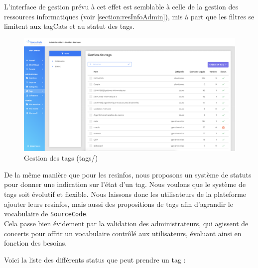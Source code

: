 L'interface de gestion prévu à cet effet est semblable à celle de la gestion des ressources informatiques (voir \ref{section:resInfoAdmin}), mis à part que les filtres se limitent aux \glspl{tagCat} et au statut des \glspl{tag}.

\begin{figure}[H]
    \includegraphics[width=\textwidth,height=\textheight,keepaspectratio]{images/client/tag-admin.png}
    \centering
    \caption[SourceCode : gestion des \glspl{tag}]{Gestion des \glspl{tag} (tags/)}
\end{figure}


De la même manière que pour les \glspl{resinfo}, nous proposons un système de statuts pour donner une indication sur l'état d'un \gls{tag}. Nous voulons que le système de \glspl{tag} soit évolutif et flexible. Nous laissons donc les utilisateurs de la plateforme ajouter leurs \glspl{resinfo}, mais aussi des propositions de \glspl{tag} afin d'agrandir le vocabulaire de \texttt{SourceCode}.\\

Cela passe bien évidement par la validation des administrateurs, qui agissent de concerts pour offrir un vocabulaire contrôlé aux utilisateurs, évoluant ainsi en fonction des besoins.

Voici la liste des différents status que peut prendre un \gls{tag} :

